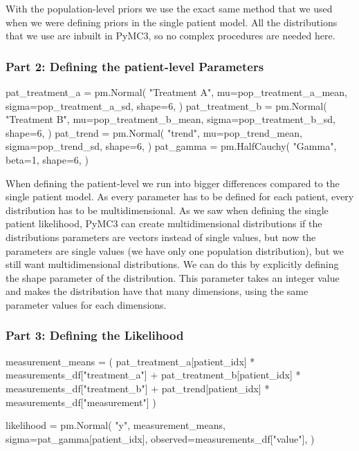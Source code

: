 \documentclass[12pt,a4paper,leqno]{report}
\theoremstyle{plain}
\theoremstyle{definition}
\theoremstyle{remark}
\begin{document}
With the population-level priors we use the exact same method that we used when we were
defining priors in the single patient model. All the distributions that we use are
inbuilt in PyMC3, so no complex procedures are needed here.

\subsubsection*{Part 2: Defining the patient-level Parameters}

\bigskip
\begin{pyverbatim}[][fontsize=\footnotesize]
    pat_treatment_a = pm.Normal(
        "Treatment A",
        mu=pop_treatment_a_mean,
        sigma=pop_treatment_a_sd,
        shape=6,
    )
    pat_treatment_b = pm.Normal(
        "Treatment B",
        mu=pop_treatment_b_mean,
        sigma=pop_treatment_b_sd,
        shape=6,
    )
    pat_trend = pm.Normal(
        "trend",
        mu=pop_trend_mean,
        sigma=pop_trend_sd,
        shape=6,
    )
    pat_gamma = pm.HalfCauchy(
        "Gamma", beta=1, shape=6,
    )
\end{pyverbatim}
\smallskip

When defining the patient-level we run into bigger differences compared to the single
patient model. As every parameter has to be defined for each patient, every distribution
has to be multidimensional. As we saw when defining the single patient likelihood, PyMC3
can create multidimensional distributions if the distributions parameters are vectors
instead of single values, but now the parameters are single values (we have only one
population distribution), but we still want multidimensional distributions. We can do
this by explicitly defining the shape parameter of the distribution. This parameter
takes an integer value and makes the distribution have that many
dimensions, using the same parameter values for each dimensions.

\subsubsection*{Part 3: Defining the Likelihood}

\bigskip
\begin{pyverbatim}[][fontsize=\footnotesize]
    measurement_means = (
        pat_treatment_a[patient_idx] * measurements_df["treatment_a"]
        + pat_treatment_b[patient_idx] * measurements_df["treatment_b"]
        + pat_trend[patient_idx] * measurements_df["measurement"]
    )

    likelihood = pm.Normal(
        "y",
        measurement_means,
        sigma=pat_gamma[patient_idx],
        observed=measurements_df["value"],
    )
\end{pyverbatim}
\smallskip
\end{document}
